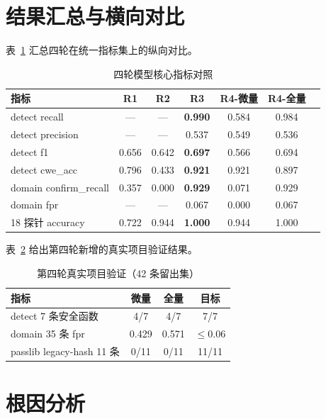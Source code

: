 \documentclass[UTF8,11pt]{ctexart}
\begin{document}
\section{结果汇总与横向对比}

表~\ref{tab:compare} 汇总四轮在统一指标集上的纵向对比。

\begin{table}[h]
\centering
\caption{四轮模型核心指标对照}
\label{tab:compare}
\small
\begin{tabular}{lcccccc}
\toprule
\textbf{指标} & \textbf{R1} & \textbf{R2} & \textbf{R3} & \textbf{R4-微量} & \textbf{R4-全量} \\
\midrule
detect recall & — & — & \textbf{0.990} & 0.584 & 0.984 \\
detect precision & — & — & 0.537 & 0.549 & 0.536 \\
detect f1 & 0.656 & 0.642 & \textbf{0.697} & 0.566 & 0.694 \\
detect cwe\_acc & 0.796 & 0.433 & \textbf{0.921} & 0.921 & 0.897 \\
domain confirm\_recall & 0.357 & 0.000 & \textbf{0.929} & 0.071 & 0.929 \\
domain fpr & — & — & 0.067 & 0.000 & 0.067 \\
18 探针 accuracy & 0.722 & 0.944 & \textbf{1.000} & 0.944 & 1.000 \\
\bottomrule
\end{tabular}
\end{table}

表~\ref{tab:r4real} 给出第四轮新增的真实项目验证结果。

\begin{table}[h]
\centering
\caption{第四轮真实项目验证（42 条留出集）}
\label{tab:r4real}
\small
\begin{tabular}{lccc}
\toprule
\textbf{指标} & \textbf{微量} & \textbf{全量} & \textbf{目标} \\
\midrule
detect 7 条安全函数 & 4/7 & 4/7 & 7/7 \\
domain 35 条 fpr & 0.429 & 0.571 & $\leq$0.06 \\
passlib legacy-hash 11 条 & 0/11 & 0/11 & 11/11 \\
\bottomrule
\end{tabular}
\end{table}

\section{根因分析}
\end{document}
